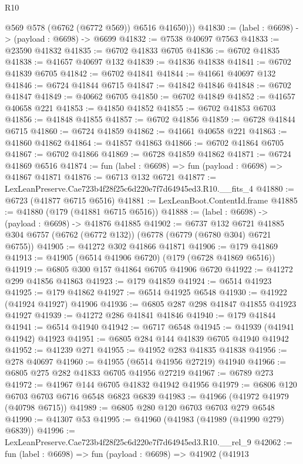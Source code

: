 \begin{lexlean}{R10}
\begin{coremodule}
          @569
          @578
          (@6762 (@6772 @569))
          @6516
          @41650)))
@41830 := (label : @6698) -> (payload : @6698) -> @6699
@41832 := @7538 @40697 @7563
@41833 := @23590 @41832
@41835 := @6702 @41833 @6705
@41836 := @6702 @41835
@41838 := @41657 @40697 @132
@41839 := @41836 @41838
@41841 := @6702 @41839 @6705
@41842 := @6702 @41841
@41844 := @41661 @40697 @132
@41846 := @6724 @41844 @6715
@41847 := @41842 @41846
@41848 := @6702 @41847
@41849 := @40662 @6705
@41850 := @6702 @41849
@41852 := @41657 @40658 @221
@41853 := @41850 @41852
@41855 := @6702 @41853 @6703
@41856 := @41848 @41855
@41857 := @6702 @41856
@41859 := @6728 @41844 @6715
@41860 := @6724 @41859
@41862 := @41661 @40658 @221
@41863 := @41860 @41862
@41864 := @41857 @41863
@41866 := @6702 @41864 @6705
@41867 := @6702 @41866
@41869 := @6728 @41859 @41862
@41871 := @6724 @41869 @6516
@41874 := fun (label : @6698) => fun (payload : @6698) => @41867 @41871
@41876 := @6713 @132 @6721
@41877 := LexLeanPreserve.Cae723b4f28f25c6d220e7f7d64945ed3.R10.__fits_4
@41880 := @6723 (@41877 @6715 @6516)
@41881 := LexLeanBoot.ContentId.frame
@41885 := @41880 (@179 (@41881 @6715 @6516))
@41888 := (label : @6698) -> (payload : @6698) -> @41876 @41885
@41902 := @6737
    @132
    @6721
    @41885
    @304
    @6757
    (@6762 (@6772 @132))
    (@6778 (@6779 (@6780 @304) @6721 @6755))
@41905 := @41272 @302 @41866 @41871
@41906 := @179 @41869
@41913 := @41905 (@6514 @41906 @6720) (@179 (@6728 @41869 @6516))
@41919 := @6805 @300 @157 @41864 @6705 @41906 @6720
@41922 := @41272 @299 @41856 @41863
@41923 := @179 @41859
@41924 := @6514 @41923
@41925 := @179 @41862
@41927 := @6514 @41925 @6548
@41930 := @41922 (@41924 @41927) @41906
@41936 := @6805 @287 @298 @41847 @41855 @41923 @41927
@41939 := @41272 @286 @41841 @41846
@41940 := @179 @41844
@41941 := @6514 @41940
@41942 := @6717 @6548
@41945 := @41939 (@41941 @41942) @41923
@41951 := @6805 @284 @144 @41839 @6705 @41940 @41942
@41952 := @41239 @271
@41955 := @41952 @283 @41835 @41838
@41956 := @278 @40697
@41960 := @41955 (@6514 @41956 @27219) @41940
@41966 := @6805 @275 @282 @41833 @6705 @41956 @27219
@41967 := @6789 @273
@41972 := @41967 @144 @6705 @41832 @41942 @41956
@41979 := @6806 @120 @6703 @6703 @6716 @6548 @6823 @6839
@41983 := @41966 (@41972 @41979 (@40798 @6715))
@41989 := @6805 @280 @120 @6703 @6703 @279 @6548
@41990 := @41307 @53
@41995 := @41960 (@41983 (@41989 (@41990 @279) @6839))
@41996 := LexLeanPreserve.Cae723b4f28f25c6d220e7f7d64945ed3.R10.__rel_9
@42062 := fun (label : @6698) =>
  fun (payload : @6698) =>
  @41902
    (@41913

\end{coremodule}
\end{lexlean}
